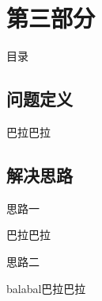 \section{第三部分}
\begin{frame}[noframenumbering]{目录}
\end{frame}

\subsection{问题定义}
\begin{frame}{\insertsection}
	\begin{defi}
		巴拉巴拉
	\end{defi}
\end{frame}
\subsection{解决思路}
\begin{frame}{\insertsection}
	\begin{solu}
		思路一
	\end{solu}
	\vspace{1.4cm}
	巴拉巴拉
\end{frame}

\begin{frame}{\insertsection}	
	\setcounter{solu}{1}
	\begin{solu}
		思路二
	\end{solu}
	\vspace{1.4cm}
	balabal巴拉巴拉
\end{frame}
